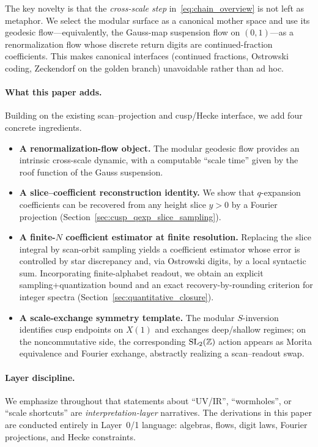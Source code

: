 The key novelty is that the \emph{cross-scale step} in~\eqref{eq:chain_overview} is not left as metaphor. We select the modular surface as a canonical mother space and use its geodesic flow---equivalently, the Gauss-map suspension flow on $(0,1)$---as a renormalization flow whose discrete return digits are continued-fraction coefficients. This makes canonical interfaces (continued fractions, Ostrowski coding, Zeckendorf on the golden branch) unavoidable rather than ad hoc.

\paragraph{What this paper adds.}
Building on the existing scan--projection and cusp/Hecke interface, we add four concrete ingredients.
\begin{itemize}
\item \textbf{A renormalization-flow object.} The modular geodesic flow provides an intrinsic cross-scale dynamic, with a computable ``scale time'' given by the roof function of the Gauss suspension.
\item \textbf{A slice--coefficient reconstruction identity.} We show that $q$-expansion coefficients can be recovered from any height slice $y>0$ by a Fourier projection (Section~\ref{sec:cusp_qexp_slice_sampling}).
\item \textbf{A finite-$N$ coefficient estimator at finite resolution.} Replacing the slice integral by scan-orbit sampling yields a coefficient estimator whose error is controlled by star discrepancy and, via Ostrowski digits, by a local syntactic sum. Incorporating finite-alphabet readout, we obtain an explicit sampling+quantization bound and an exact recovery-by-rounding criterion for integer spectra (Section~\ref{sec:quantitative_closure}).
\item \textbf{A scale-exchange symmetry template.} The modular $S$-inversion identifies cusp endpoints on $X(1)$ and exchanges deep/shallow regimes; on the noncommutative side, the corresponding $\mathrm{SL}_2(\mathbb{Z})$ action appears as Morita equivalence and Fourier exchange, abstractly realizing a scan--readout swap.
\end{itemize}

\paragraph{Layer discipline.}
We emphasize throughout that statements about ``UV/IR'', ``wormholes'', or ``scale shortcuts'' are \emph{interpretation-layer} narratives. The derivations in this paper are conducted entirely in Layer~0/1 language: algebras, flows, digit laws, Fourier projections, and Hecke constraints.


